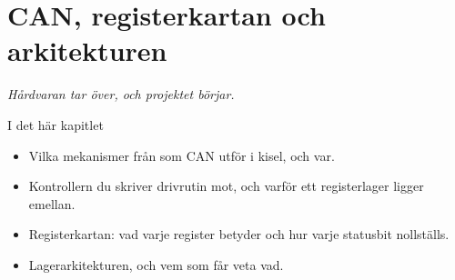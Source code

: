 \chapter{CAN, registerkartan och arkitekturen}
\label{ch:can}


{\large\itshape Hårdvaran tar över, och projektet börjar.\par}

\begin{chapterbox}{I det här kapitlet}
\begin{itemize}
  \item Vilka mekanismer från  som CAN utför i kisel, och var.
  \item Kontrollern du skriver drivrutin mot, och varför ett registerlager ligger emellan.
  \item Registerkartan: vad varje register betyder och hur varje statusbit nollställs.
  \item Lagerarkitekturen, och vem som får veta vad.
\end{itemize}
\end{chapterbox}






